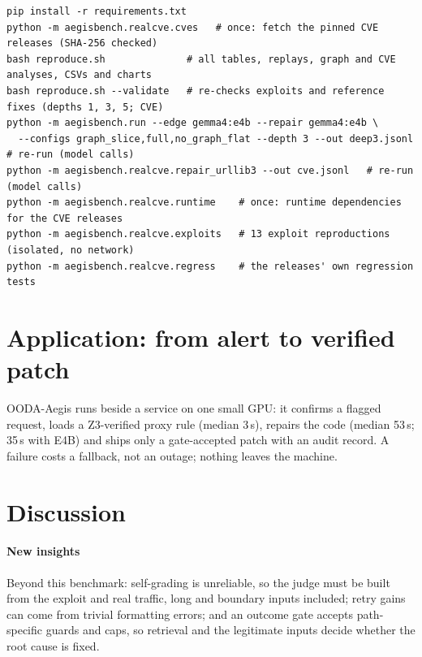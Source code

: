 \documentclass[journal]{IEEEtran}
\begin{document}
\begin{table}[!t]
\caption{Commands that regenerate every number and chart from the raw logs (no model calls), and re-run the experiments.}
\label{tab:repro}
{\footnotesize\begin{verbatim}
pip install -r requirements.txt
python -m aegisbench.realcve.cves   # once: fetch the pinned CVE releases (SHA-256 checked)
bash reproduce.sh              # all tables, replays, graph and CVE analyses, CSVs and charts
bash reproduce.sh --validate   # re-checks exploits and reference fixes (depths 1, 3, 5; CVE)
python -m aegisbench.run --edge gemma4:e4b --repair gemma4:e4b \
  --configs graph_slice,full,no_graph_flat --depth 3 --out deep3.jsonl   # re-run (model calls)
python -m aegisbench.realcve.repair_urllib3 --out cve.jsonl   # re-run (model calls)
python -m aegisbench.realcve.runtime    # once: runtime dependencies for the CVE releases
python -m aegisbench.realcve.exploits   # 13 exploit reproductions (isolated, no network)
python -m aegisbench.realcve.regress    # the releases' own regression tests
\end{verbatim}}
\end{table}

\section{Application: from alert to verified patch}\label{sec:app}
OODA-Aegis runs beside a service on one small GPU: it confirms a flagged request, loads a Z3-verified proxy rule (median 3\,s), repairs the code (median 53\,s; 35\,s with E4B) and ships only a gate-accepted patch with an audit record. A failure costs a fallback, not an outage; nothing leaves the machine.

\section{Discussion}\label{sec:disc}

\paragraph{New insights} Beyond this benchmark: self-grading is unreliable, so the judge must be built from the exploit and real traffic, long and boundary inputs included; retry gains can come from trivial formatting errors; and an outcome gate accepts path-specific guards and caps, so retrieval and the legitimate inputs decide whether the root cause is fixed.
\end{document}
